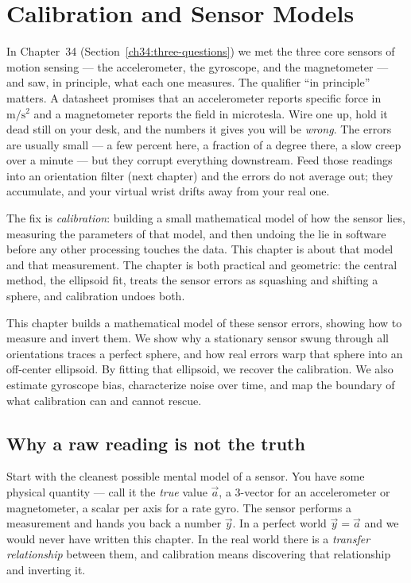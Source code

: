 \chapter{Calibration and Sensor Models}

In Chapter~34 (Section~\ref{ch34:three-questions}) we met the three core sensors of motion sensing ---
the accelerometer, the gyroscope, and the magnetometer --- and saw, in principle,
what each one measures. The qualifier ``in principle'' matters. A
datasheet promises that an accelerometer reports specific force in
$\mathrm{m/s^2}$ and a magnetometer reports the field in microtesla. Wire one up,
hold it dead still on your desk, and the numbers it gives you will be
\emph{wrong}. The errors are usually small --- a few percent here, a
fraction of a degree there, a slow creep over a minute --- but they corrupt
everything downstream. Feed those readings into an orientation
filter (next chapter) and the errors do not average out; they accumulate, and
your virtual wrist drifts away from your real one.

The fix is \emph{calibration}: building a small mathematical model of how the
sensor lies, measuring the parameters of that model, and then undoing the lie in
software before any other processing touches the data. This chapter is about
that model and that measurement. The chapter is both practical and geometric: the central
method, the ellipsoid fit, treats the sensor errors as squashing and shifting a
sphere, and calibration undoes both.

This chapter builds a mathematical model of these sensor errors, showing how to measure and invert them. We show why a stationary sensor swung through all orientations traces a perfect sphere, and how real errors warp that sphere into an off-center ellipsoid. By fitting that ellipsoid, we recover the calibration. We also estimate gyroscope bias, characterize noise over time, and map the boundary of what calibration can and cannot rescue.

\section{Why a raw reading is not the truth}
\label{ch35:why-raw-lies}

Start with the cleanest possible mental model of a sensor. You have some
physical quantity --- call it the \emph{true} value $\vec{a}$, a 3-vector for an
accelerometer or magnetometer, a scalar per axis for a rate gyro. The sensor
performs a measurement and hands you back a number $\vec{y}$. In a perfect world
$\vec{y} = \vec{a}$ and we would never have written this chapter. In the real
world there is a \emph{transfer relationship} between them, and
calibration means discovering that relationship and inverting it.

